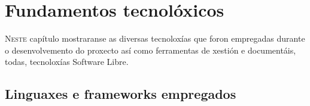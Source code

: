 \chapter{Fundamentos tecnolóxicos}
\minitoc
\label{chap:Fundamentostecnoloxicos}
\vspace{0.5cm}


  \lettrine{N}{este} capítulo mostraranse as diversas tecnoloxías que foron empregadas 
durante o desenvolvemento do proxecto así como ferramentas de xestión e documentáis, 
todas, tecnoloxías Software Libre.

  \section{Linguaxes e frameworks empregados}
  


